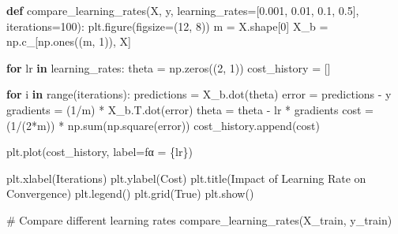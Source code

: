 \documentclass[
  letterpaper,
  DIV=11,
  numbers=noendperiod]{scrreprt}
\newenvironment{Shaded}{\begin{snugshade}}{\end{snugshade}}
\newcommand{\BuiltInTok}[1]{\textcolor[rgb]{0.00,0.23,0.31}{#1}}
\newcommand{\CommentTok}[1]{\textcolor[rgb]{0.37,0.37,0.37}{#1}}
\newcommand{\ControlFlowTok}[1]{\textcolor[rgb]{0.00,0.23,0.31}{\textbf{#1}}}
\newcommand{\DecValTok}[1]{\textcolor[rgb]{0.68,0.00,0.00}{#1}}
\newcommand{\FloatTok}[1]{\textcolor[rgb]{0.68,0.00,0.00}{#1}}
\newcommand{\KeywordTok}[1]{\textcolor[rgb]{0.00,0.23,0.31}{\textbf{#1}}}
\newcommand{\NormalTok}[1]{\textcolor[rgb]{0.00,0.23,0.31}{#1}}
\newcommand{\OperatorTok}[1]{\textcolor[rgb]{0.37,0.37,0.37}{#1}}
\newcommand{\SpecialCharTok}[1]{\textcolor[rgb]{0.37,0.37,0.37}{#1}}
\newcommand{\SpecialStringTok}[1]{\textcolor[rgb]{0.13,0.47,0.30}{#1}}
\newcommand{\StringTok}[1]{\textcolor[rgb]{0.13,0.47,0.30}{#1}}
\newcommand{\VariableTok}[1]{\textcolor[rgb]{0.07,0.07,0.07}{#1}}
\begin{document}
\begin{Shaded}
\begin{Highlighting}[]
\KeywordTok{def}\NormalTok{ compare\_learning\_rates(X, y, learning\_rates}\OperatorTok{=}\NormalTok{[}\FloatTok{0.001}\NormalTok{, }\FloatTok{0.01}\NormalTok{, }\FloatTok{0.1}\NormalTok{, }\FloatTok{0.5}\NormalTok{], iterations}\OperatorTok{=}\DecValTok{100}\NormalTok{):}
\NormalTok{    plt.figure(figsize}\OperatorTok{=}\NormalTok{(}\DecValTok{12}\NormalTok{, }\DecValTok{8}\NormalTok{))}
\NormalTok{    m }\OperatorTok{=}\NormalTok{ X.shape[}\DecValTok{0}\NormalTok{]}
\NormalTok{    X\_b }\OperatorTok{=}\NormalTok{ np.c\_[np.ones((m, }\DecValTok{1}\NormalTok{)), X]}
    
    \ControlFlowTok{for}\NormalTok{ lr }\KeywordTok{in}\NormalTok{ learning\_rates:}
\NormalTok{        theta }\OperatorTok{=}\NormalTok{ np.zeros((}\DecValTok{2}\NormalTok{, }\DecValTok{1}\NormalTok{))}
\NormalTok{        cost\_history }\OperatorTok{=}\NormalTok{ []}
        
        \ControlFlowTok{for}\NormalTok{ i }\KeywordTok{in} \BuiltInTok{range}\NormalTok{(iterations):}
\NormalTok{            predictions }\OperatorTok{=}\NormalTok{ X\_b.dot(theta)}
\NormalTok{            error }\OperatorTok{=}\NormalTok{ predictions }\OperatorTok{{-}}\NormalTok{ y}
\NormalTok{            gradients }\OperatorTok{=}\NormalTok{ (}\DecValTok{1}\OperatorTok{/}\NormalTok{m) }\OperatorTok{*}\NormalTok{ X\_b.T.dot(error)}
\NormalTok{            theta }\OperatorTok{=}\NormalTok{ theta }\OperatorTok{{-}}\NormalTok{ lr }\OperatorTok{*}\NormalTok{ gradients}
\NormalTok{            cost }\OperatorTok{=}\NormalTok{ (}\DecValTok{1}\OperatorTok{/}\NormalTok{(}\DecValTok{2}\OperatorTok{*}\NormalTok{m)) }\OperatorTok{*}\NormalTok{ np.}\BuiltInTok{sum}\NormalTok{(np.square(error))}
\NormalTok{            cost\_history.append(cost)}
        
\NormalTok{        plt.plot(cost\_history, label}\OperatorTok{=}\SpecialStringTok{f\textquotesingle{}α = }\SpecialCharTok{\{}\NormalTok{lr}\SpecialCharTok{\}}\SpecialStringTok{\textquotesingle{}}\NormalTok{)}
    
\NormalTok{    plt.xlabel(}\StringTok{\textquotesingle{}Iterations\textquotesingle{}}\NormalTok{)}
\NormalTok{    plt.ylabel(}\StringTok{\textquotesingle{}Cost\textquotesingle{}}\NormalTok{)}
\NormalTok{    plt.title(}\StringTok{\textquotesingle{}Impact of Learning Rate on Convergence\textquotesingle{}}\NormalTok{)}
\NormalTok{    plt.legend()}
\NormalTok{    plt.grid(}\VariableTok{True}\NormalTok{)}
\NormalTok{    plt.show()}

\CommentTok{\# Compare different learning rates}
\NormalTok{compare\_learning\_rates(X\_train, y\_train)}
\end{Highlighting}
\end{Shaded}
\end{document}
